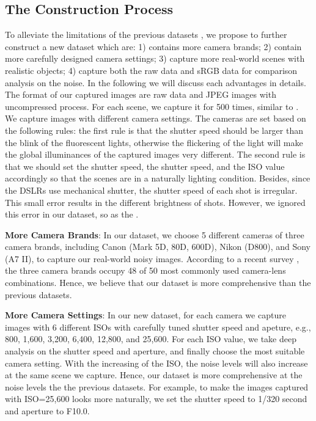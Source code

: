 \subsection{The Construction Process}

To alleviate the limitations of the previous datasets \cite{RENOIR2014,crosschannel2016,dnd2017}, we propose to further construct a new dataset which are: 1) contains more camera brands; 2) contain more carefully designed camera settings; 3) capture more real-world scenes with realistic objects; 4) capture both the raw data and sRGB data for comparison analysis on the noise. In the following we will discuss each advantages in details. The format of our captured images are raw data and JPEG images with uncompressed process. For each scene, we capture it for 500 times, similar to \cite{crosschannel2016}. We capture images with different camera settings. The cameras are set based on the following rules: the first rule is that the shutter speed should be larger than the blink of the fluorescent lights, otherwise the flickering of the light will make the global illuminances of the captured images very different. The second rule is that we should set the shutter speed, the shutter speed, and the ISO value accordingly so that the scenes are in a naturally lighting condition. Besides, since the DSLRs use mechanical shutter, the shutter speed of each shot is irregular. This small error results in the different brightness of shots. However, we ignored this error in our dataset, so as the \cite{crosschannel2016}.

\textbf{More Camera Brands}: In our dataset, we choose 5 different cameras of three camera brands, including Canon (Mark 5D, 80D, 600D), Nikon (D800), and Sony (A7 II), to capture our real-world noisy images. According to a recent survey \cite{commoncamera}, the three camera brands occupy 48 of 50 most commonly used camera-lens combinations. Hence, we believe that our dataset is more comprehensive than the previous datasets.


\textbf{More Camera Settings}: In our new dataset, for each camera we capture images with 6 different ISOs with carefully tuned shutter speed and apeture, e.g., 800, 1,600, 3,200, 6,400, 12,800, and 25,600. For each ISO value, we take deep analysis on the shutter speed and aperture, and finally choose the most suitable camera setting. With the increasing of the ISO, the noise levels will also increase at the same scene we capture. Hence, our dataset is more comprehensive at the noise levels the the previous datasets. For example, to make the images captured with ISO=25,600 looks more naturally, we set the shutter speed to 1/320 second and aperture to F10.0. 


